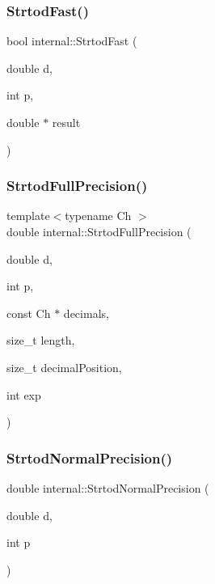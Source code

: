 \mbox{\label{namespaceinternal_a598b2d2f85130bff3c3942e4750b9185}} 
\subsubsection{\texorpdfstring{Strtod\+Fast()}{StrtodFast()}}
{\footnotesize\ttfamily bool internal\+::\+Strtod\+Fast (\begin{DoxyParamCaption}\item[{double}]{d,  }\item[{int}]{p,  }\item[{double $\ast$}]{result }\end{DoxyParamCaption})\hspace{0.3cm}{\ttfamily [inline]}}

\mbox{\label{namespaceinternal_a6109c750ee4707d4f71de280816a1a00}} 
\subsubsection{\texorpdfstring{Strtod\+Full\+Precision()}{StrtodFullPrecision()}}
{\footnotesize\ttfamily template$<$typename Ch $>$ \\
double internal\+::\+Strtod\+Full\+Precision (\begin{DoxyParamCaption}\item[{double}]{d,  }\item[{int}]{p,  }\item[{const Ch $\ast$}]{decimals,  }\item[{size\+\_\+t}]{length,  }\item[{size\+\_\+t}]{decimal\+Position,  }\item[{int}]{exp }\end{DoxyParamCaption})\hspace{0.3cm}{\ttfamily [inline]}}

\mbox{\label{namespaceinternal_a9e5fac4695310f09892fe52b1d24ab19}} 
\subsubsection{\texorpdfstring{Strtod\+Normal\+Precision()}{StrtodNormalPrecision()}}
{\footnotesize\ttfamily double internal\+::\+Strtod\+Normal\+Precision (\begin{DoxyParamCaption}\item[{double}]{d,  }\item[{int}]{p }\end{DoxyParamCaption})\hspace{0.3cm}{\ttfamily [inline]}}

